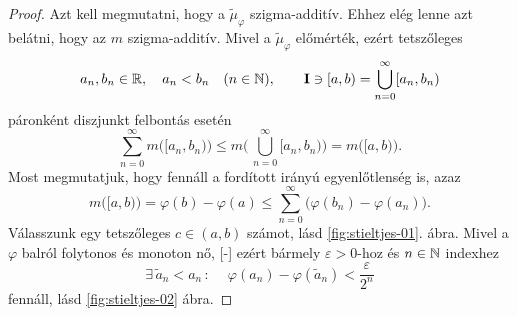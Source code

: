 \documentclass[
]{elteikthesis}[2024/04/26]
\begin{document}
\begin{proof}
		
		\newpage
		\Backifstep
		Azt kell megmutatni, hogy a \( \widetilde{\mu}_\varphi \) szigma-additív.
		Ehhez elég lenne azt belátni, hogy az \( m \) szigma-additív.
		Mivel a \( \widetilde{\mu}_\varphi \) előmérték, ezért tetszőleges
		\[
			a_n, b_n \in \mathbb{R}, \quad a_n < b_n \quad (n \in \mathbb{N}), \qquad 
			\mathbf{I} \ni [a, b) = \bigcup_{n = 0}^{\infty} [a_n, b_n)
		\]
		páronként diszjunkt felbontás esetén
		\[
			\sum_{n=0}^{\infty} m \bigl( [a_n, b_n) \bigr) \leq
			m \Biggl( \, \bigcup_{n = 0}^{\infty} [a_n, b_n) \Biggr) =
			m \bigl( [a, b) \bigr).
		\]
		Most megmutatjuk, hogy fennáll a fordított irányú egyenlőtlenség is, azaz
		\[
			m \bigl( [a, b) \bigr) = 
			\varphi(b) - \varphi(a) \leq
			\sum_{n=0}^{\infty} \bigl( \varphi(b_n) - \varphi(a_n) \bigr).
		\]
		Válasszunk egy tetszőleges \( c \in (a,b) \) számot, lásd \ref{fig:stieltjes-01}. ábra.
		Mivel a \( \varphi \) balról folytonos és monoton nő,
		[-\baselineskip]
		ezért bármely \( \varepsilon > 0 \)-hoz és \( n \in \mathbb{N} \) indexhez
		\begin{equation}\label{eq:stieltjes-02}
			\exists \,\widetilde{a}_n < a_n \, \colon \ \quad
			\varphi( a_n ) - \varphi( \widetilde{a}_n ) < \frac{\varepsilon}{2^n}
			\tag{\( ** \)}
		\end{equation}
		fennáll, lásd \ref{fig:stieltjes-02} ábra.
\end{proof}
\end{document}
